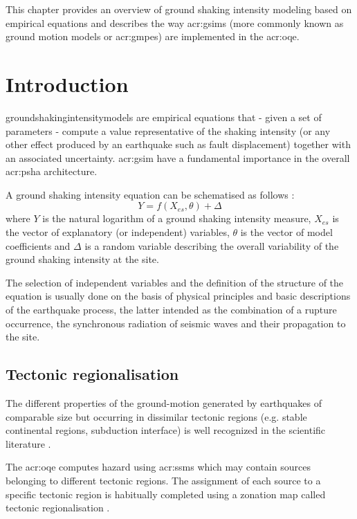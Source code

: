 This chapter provides an overview of ground shaking intensity modeling based 
on empirical equations and describes the way \glspl{acr:gsim} (more commonly 
known as ground motion models or \glspl{acr:gmpe}) are implemented in the 
\gls{acr:oqe}.
%
\section{Introduction}
%
\Glspl{groundshakingintensitymodel} are empirical equations that - given a 
set of parameters - compute a value representative of the shaking 
intensity (or any other effect produced by an earthquake such as fault 
displacement) together with an associated uncertainty. 
%
\gls{acr:gsim} have a fundamental importance in the overall \gls{acr:psha} 
architecture.

A ground shaking intensity equation can be schematised as follows 
\parencite{alatik2010}: 
\begin{equation}
Y = f(X_{es},\theta)+\Delta
\end{equation}
where $Y$ is the natural logarithm of a ground shaking intensity measure, 
$X_{es}$ is the vector of explanatory (or independent) variables, $\theta$ 
is the vector of model coefficients and $\Delta$ is a random variable 
describing the overall variability of the ground shaking intensity at 
the site.

The selection of independent variables and the definition of the structure 
of the equation is usually done on the basis of physical principles and 
basic descriptions of the earthquake process, the latter
intended as the combination of a rupture occurrence, the synchronous 
radiation of seismic waves and their propagation to the site.
%
\subsection{Tectonic regionalisation}
The different properties of the ground-motion generated by earthquakes 
of comparable size but occurring in dissimilar tectonic regions (e.g. 
stable continental regions, subduction interface) is well recognized in 
the scientific literature \parencite{abrahamson1997}.

The \gls{acr:oqe} computes hazard using \glspl{acr:ssm} which may contain 
sources belonging to different tectonic regions. 
%
The assignment of each source to a specific tectonic region is habitually 
completed using a zonation map called tectonic regionalisation 
\parencite[see for example][]{delavaud2012}.

